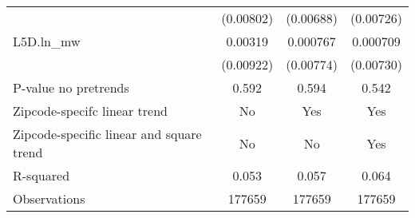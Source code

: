 {\begin{tabular}{l*{3}{c}}
          &(0.00802)         &(0.00688)         &(0.00726)         \\
[1em]
L5D.ln\_mw &  0.00319         & 0.000767         & 0.000709         \\
          &(0.00922)         &(0.00774)         &(0.00730)         \\
\hline
P-value no pretrends&    0.592         &    0.594         &    0.542         \\
Zipcode-specifc linear trend&       No         &      Yes         &      Yes         \\
Zipcode-specific linear and square trend&       No         &       No         &      Yes         \\
R-squared &    0.053         &    0.057         &    0.064         \\
Observations&   177659         &   177659         &   177659         \\
\hline\hline
\end{tabular}
}
